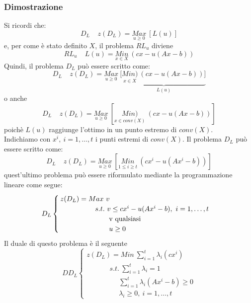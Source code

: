 \subsubsection{Dimostrazione}
Si ricordi che:
\begin{equation*}
	D_{L}\ \ \ \ \ z(D_{L})=\underset{u\ge 0}{Max}\ [L(u)]
\end{equation*}
e, per come è stato definito $X$, il problema $RL_{u}$ diviene
\begin{equation*}
	RL_{u}\ \ \ \ \ L(u)=\underset{x\in X}{Min}\ (cx-u(Ax-b))
\end{equation*}
Quindi, il problema $D_{L}$ può essere scritto come:
\begin{equation*}
	D_{L}\ \ \ \ \ z(D_{L})=\underset{u\ge 0}{Max}\ [\underbrace{\underset{x\in X}{Min)}\ (cx-u(Ax-b))]}_{L(u)}
\end{equation*}
o anche
\begin{equation*}
D_{L}\ \ \ \ \ z(D_{L})=\underset{u\ge 0}{Max}\ [\underset{x\in conv(X)}{Min)}\ (cx-u(Ax-b))]
\end{equation*}
poichè $L(u)$ raggiunge l'ottimo in un punto estremo di $conv(X)$.\\
Indichiamo con $x^{i},\ i=1,\dots,t$ i punti estremi di $conv(X)$. Il problema $D_{L}$ può essere scritto come:
\begin{equation*}
	D_{L}\ \ \ \ \ z(D_{L})=\underset{u\ge 0}{Max}\ [\underset{1\le i\ge t}{Min}\ (cx^{i}-u(Ax^{i}-b))]
\end{equation*}
quest'ultimo problema può essere riformulato mediante la programmazione lineare come segue:
\begin{equation*}
	D_{L}
	\begin{cases}
	z(D_{L})=Max\  v \\
	\ \ \ \ \ \ \ \ \ \ \ \ \ \ \ s.t.\  v\le cx^{i}-u(Ax^{i}-b),\ i=1,\dots,t\\
	\ \ \ \ \ \ \ \ \ \ \ \ \ \ \ \ \ \ \ \ \ \textnormal{v qualsiasi} \\
	\ \ \ \ \ \ \ \ \ \ \ \ \ \ \ \ \ \ \ \ \ u\ge 0
	\end{cases}
\end{equation*}
Il duale di questo problema è il seguente
\begin{equation*}
	DD_{L}
	\begin{cases}
		z(D_{L})=Min\ \sum_{i=1}^{t}\lambda_{i}(cx^{i})\\
		\ \ \ \ \ \ \ \ \ \ \ \ \ \ \ s.t.\  \sum_{i=1}^{t}\lambda_{i}=1 \\
		\ \ \ \ \ \ \ \ \ \ \ \ \ \ \ \ \ \ \ \ \ \sum_{i=1}^{t}\lambda_{i}(Ax^{i}-b)\ge 0 \\
		\ \ \ \ \ \ \ \ \ \ \ \ \ \ \ \ \ \ \ \ \ \lambda_{i}\ge 0,\ i=1,\dots,t
	\end{cases}
\end{equation*}
